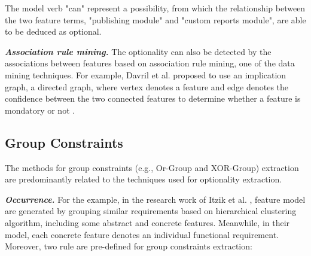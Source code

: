 \documentclass[graybox]{svmult}
\begin{document}
The model verb "can" represent a possibility, from which the relationship between the two feature terms, "publishing module" and "custom reports module", are able to be deduced as optional.



\textit{\textbf{Association rule mining.}} The optionality can also be detected by the associations between features based on association rule mining, one of the data mining techniques. For example, Davril et al. proposed to use an implication graph, a directed graph, where vertex denotes a feature and edge denotes the confidence between the two connected features to determine whether a feature is mondatory or not \cite{DavrilDHACH13}.




\subsection{Group Constraints}
The methods for group constraints (e.g., Or-Group and XOR-Group) extraction are predominantly related to the techniques used for optionality extraction.

\textit{\textbf{Occurrence.}} For the example, in the research work of Itzik et al. \cite{ItzikR14}, feature model are generated by grouping similar requirements based on hierarchical clustering algorithm, including some abstract and concrete features. Meanwhile, in their model, each concrete feature denotes an individual functional requirement. Moreover, two rule are pre-defined for group constraints extraction:
\end{document}

